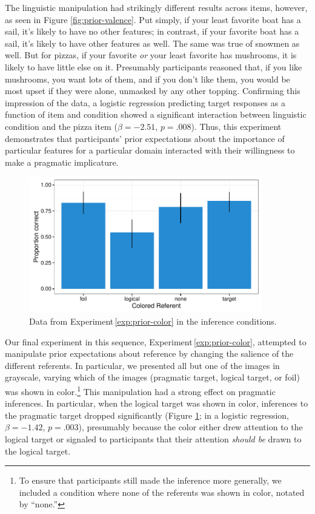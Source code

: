 \documentclass[man,noapacite]{apa2}
\newcounter{Experiment}
\newcommand{\exptref}[1]{Experiment\,\ref{#1}}
\begin{document}
The linguistic manipulation had strikingly different results across items, however, as seen in Figure \ref{fig:prior-valence}. Put simply, if your least favorite boat has a sail, it's likely to have no other features; in contrast, if your favorite boat has a sail, it's likely to have other features as well. The same was true of snowmen as well. But for pizzas, if your favorite \emph{or} your least favorite has mushrooms, it is likely to have little else on it. Presumably participants reasoned that, if you like mushrooms, you want lots of them, and if you don't like them, you would be most upset if they were alone, unmasked by any other topping. Confirming this impression of the data, a logistic regression predicting target responses as a function of item and condition showed a significant interaction between linguistic condition and the pizza item ($\beta = -2.51$, $p = .008$). Thus, this experiment demonstrates that participants' prior expectations about the importance of particular features for a particular domain interacted with their willingness to make a pragmatic implicature.

\begin{figure}[t]
  \centering
  \includegraphics[width=4in]{../plots/2-prior-color.pdf}
  \caption{\label{fig:prior-color} Data from \exptref{exp:prior-color} in the inference conditions.}
\end{figure}

Our final experiment in this sequence, \exptref{exp:prior-color}, attempted to manipulate prior expectations about reference by changing the salience of the different referents. In particular, we presented all but one of the images in grayscale, varying which of the images (pragmatic target, logical target, or foil) was shown in color.\footnote{To ensure that participants still made the inference more generally, we included a condition where none of the referents was shown in color, notated by ``none.''} This manipulation had a strong effect on pragmatic inferences. In particular, when the logical target was shown in color, inferences to the pragmatic target dropped significantly (Figure \ref{fig:prior-color}; in a logistic regression, $\beta = -1.42$, $p = .003$), presumably because the color either drew attention to the logical target or signaled to participants that their attention \emph{should be} drawn to the logical target.
\end{document}

